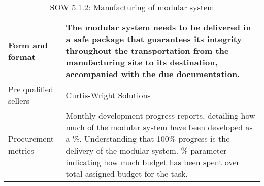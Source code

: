 \begin{table}[H]
\begin{tabular}{>{\raggedright\arraybackslash}p{3cm} >{\arraybackslash}p{11cm}}
		\midrule
		
		Form and format & The modular system needs to be delivered in a safe package that guarantees its integrity throughout the transportation from the manufacturing site to its destination, accompanied with the due documentation.\vspace{0.2cm} \\
		
		\midrule
		
		Pre qualified sellers & Curtis-Wright Solutions \vspace{0.2cm} \\
		
		\midrule
		
		Procurement metrics & Monthly development progress reports, detailing how much of the modular system have been developed as a \%. Understanding that 100\% progress is the delivery of the modular system. \% parameter indicating how much budget has been spent over total assigned budget for the task. \vspace{0.2cm} \\
		
		\bottomrule[2pt]		
		
	\end{tabular}
	\caption{SOW 5.1.2: Manufacturing of modular system}
\end{table}

